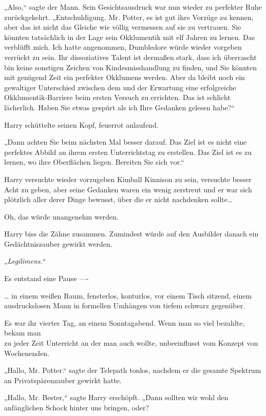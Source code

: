 {„Also,“ sagte der Mann. Sein Gesichtsausdruck war nun wieder zu perfekter Ruhe zurückgekehrt. „Entschuldigung. Mr. Potter, es ist gut ihre Vorzüge zu kennen, aber das ist nicht das Gleiche wie völlig vermessen auf sie zu vertrauen. Sie könnten tatsächlich in der Lage sein Okklumentik mit elf Jahren zu lernen. Das verblüfft mich. Ich hatte angenommen, Dumbledore würde wieder vorgeben verrückt zu sein. Ihr dissoziatives Talent ist dermaßen stark, dass ich überrascht bin keine sonstigen Zeichen von Kindesmisshandlung zu finden, und Sie könnten mit genügend Zeit ein perfekter Okklumens werden. Aber da bleibt noch ein gewaltiger Unterschied zwischen dem und der Erwartung eine erfolgreiche Okklumentik-Barriere beim ersten Versuch zu errichten. Das ist schlicht lächerlich. Haben Sie etwas gespürt als ich Ihre Gedanken gelesen habe?“

Harry schüttelte seinen Kopf, feuerrot anlaufend.

„Dann achten Sie beim nächsten Mal besser darauf. Das Ziel ist es nicht eine perfektes Abbild an ihrem ersten Unterrichtstag zu erstellen. Das Ziel ist es zu lernen, wo ihre Oberflächen liegen. Bereiten Sie sich vor.“

Harry versuchte wieder vorzugeben Kimball Kinnison zu sein, versuchte besser Acht zu geben, aber seine Gedanken waren ein wenig zerstreut und er war sich plötzlich aller derer Dinge bewusst, über die er nicht nachdenken sollte…

Oh, das würde unangenehm werden.

Harry biss die Zähne zusammen. Zumindest würde auf den Ausbilder danach ein Gedächtniszauber gewirkt werden.

„\emph{Legilimens.“}

Es entstand eine Pause ----

… in einem weißen Raum, fensterlos, konturlos, vor einem Tisch sitzend, einem ausdruckslosen Mann in formellen Umhängen von tiefem schwarz gegenüber.

Es war ihr vierter Tag, an einem Sonntagabend. Wenn man so viel bezahlte, bekam man\\ zu jeder Zeit Unterricht an der man auch wollte, unbeeinflusst vom Konzept von Wochenenden.

„Hallo, Mr. Potter.“ sagte der Telepath tonlos, nachdem er die gesamte Spektrum an Privatspärenzauber gewirkt hatte.

„Hallo, Mr. Bester,“ sagte Harry erschöpft. „Dann sollten wir wohl den anfänglichen Schock hinter uns bringen, oder?

}
